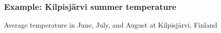 \documentclass[10pt]{beamer}
\begin{document}
\begin{frame}

\frametitle{Example: Kilpisjärvi summer temperature}

  Average temperature in June, July, and August at Kilpisjärvi, Finland

  \begin{center}
  \end{center}

\end{frame}
\end{document}
